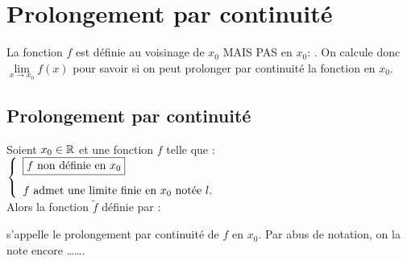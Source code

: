 \documentclass[a4paper, 11pt]{article}
\begin{document}
{\section{Prolongement par continuit\'e}

\noindent La fonction $f$ est d\'efinie au voisinage de $x_0$ MAIS PAS en $x_0$: . On calcule donc $\lim\limits_{x\to x_0} f(x)$ pour savoir si on peut prolonger par continuit\'e la fonction en $x_0$.


\subsection{Prolongement par continuit\'e}


\begin{defi}
	Soient $x_0\in\mathbb{R}$ et une fonction $f$ telle que :
	$\left\{\begin{array}{l}
			\textmd{\fbox{$f$ non d\'efinie en $x_0$}}\vsec \\
			\textmd{$f$ admet une limite finie en $x_0$ not\'ee $l$.}
		\end{array}\right.$\\
	Alors la fonction $\tilde f$ d\'efinie par :


	s'appelle le prolongement par continuit\'e de $f$ en $x_0$. Par abus de notation, on la note encore \ldots\ldots.
\end{defi}

%
%
% 
%
% 

}
\end{document}
